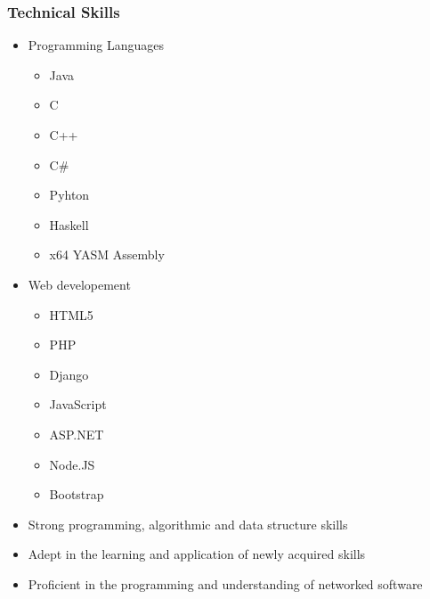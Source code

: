 \documentclass{article}
\begin{document}
		\subsubsection{Technical Skills}
		\begin{itemize}
			\item Programming Languages
			\begin{itemize}
				\item Java
				\item C
				\item C++
				\item C\#
				\item Pyhton
				\item Haskell
				\item x64 YASM Assembly 
			\end{itemize}
			\item Web developement
			\begin{itemize}
				\item HTML5
				\item PHP
				\item Django
				\item JavaScript
				\item ASP.NET
				\item Node.JS
				\item Bootstrap
			\end{itemize}
			\item Strong programming, algorithmic and data structure skills
			\item Adept in the learning and application of newly acquired skills
			\item Proficient in the programming and understanding of networked software
		\end{itemize}
\end{document}

